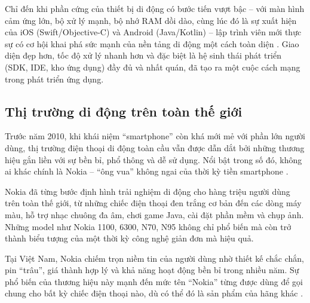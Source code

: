 \begin{flushleft}
\hspace*{0.8cm}Chỉ đến khi phần cứng của thiết bị di động có bước tiến vượt bậc – với màn hình cảm ứng lớn, bộ xử lý mạnh, bộ nhớ RAM dồi dào, cùng lúc đó là sự xuất hiện của iOS (Swift/Objective-C) và Android (Java/Kotlin) – lập trình viên mới thực sự có cơ hội khai phá sức mạnh của nền tảng di động một cách toàn diện \cite{ios-android-shift}. Giao diện đẹp hơn, tốc độ xử lý nhanh hơn và đặc biệt là hệ sinh thái phát triển (SDK, IDE, kho ứng dụng) đầy đủ và nhất quán, đã tạo ra một cuộc cách mạng trong phát triển ứng dụng.
\end{flushleft}

\subsection{Thị trường di động trên toàn thế giới}
\renewcommand{\labelitemi}{--}    
\begin{flushleft}
  \hspace*{0.8cm}Trước năm 2010, khi khái niệm “smartphone” còn khá mới mẻ với phần lớn người dùng, thị trường điện thoại di động toàn cầu vẫn được dẫn dắt bởi những thương hiệu gắn liền với sự bền bỉ, phổ thông và dễ sử dụng. Nổi bật trong số đó, không ai khác chính là Nokia – “ông vua” không ngai của thời kỳ tiền smartphone \cite{nokia-dominance}.
  \end{flushleft}
  
  \begin{flushleft}
  \hspace*{0.8cm}Nokia đã từng bước định hình trải nghiệm di động cho hàng triệu người dùng trên toàn thế giới, từ những chiếc điện thoại đen trắng cơ bản đến các dòng máy màu, hỗ trợ nhạc chuông đa âm, chơi game Java, cài đặt phần mềm và chụp ảnh. Những model như Nokia 1100, 6300, N70, N95 không chỉ phổ biến mà còn trở thành biểu tượng của một thời kỳ công nghệ giản đơn mà hiệu quả\cite{nokia-iconic-models}.
  \end{flushleft}
  
  \begin{flushleft}
  \hspace*{0.8cm}Tại Việt Nam, Nokia chiếm trọn niềm tin của người dùng nhờ thiết kế chắc chắn, pin “trâu”, giá thành hợp lý và khả năng hoạt động bền bỉ trong nhiều năm. Sự phổ biến của thương hiệu này mạnh đến mức tên “Nokia” từng được dùng để gọi chung cho bất kỳ chiếc điện thoại nào, dù có thể đó là sản phẩm của hãng khác \cite{nokia-vietnam-popularity}.
  \end{flushleft}
  
